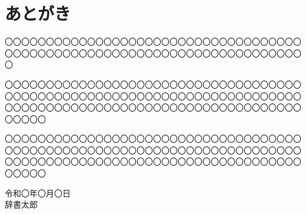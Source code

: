 \chapter*{あとがき}\label{atogaki}
\thispagestyle{plain}

〇〇〇〇〇〇〇〇〇〇〇〇〇〇〇〇〇〇〇〇〇〇〇〇〇〇〇〇〇〇〇〇〇〇〇〇〇〇〇〇〇〇〇〇〇〇〇〇〇〇〇〇〇〇〇〇〇〇〇〇〇〇〇〇〇〇〇〇〇〇〇〇〇

〇〇〇〇〇〇〇〇〇〇〇〇〇〇〇〇〇〇〇〇〇〇〇〇〇〇〇〇〇〇〇〇〇〇〇〇〇〇〇〇〇〇〇〇〇〇〇〇〇〇〇〇〇〇〇〇〇〇〇〇〇〇〇〇〇〇〇〇〇〇〇〇〇〇〇〇〇〇〇〇〇〇〇〇〇〇〇〇〇〇〇〇〇〇〇〇〇〇〇〇〇〇〇〇〇〇〇〇〇〇〇〇〇

〇〇〇〇〇〇〇〇〇〇〇〇〇〇〇〇〇〇〇〇〇〇〇〇〇〇〇〇〇〇〇〇〇〇〇〇〇〇〇〇〇〇〇〇〇〇〇〇〇〇〇〇〇〇〇〇〇〇〇〇〇〇〇〇〇〇〇〇〇〇〇〇〇〇〇〇〇〇〇〇〇〇〇〇〇〇〇〇〇〇〇〇〇〇〇〇〇〇〇〇〇〇〇〇〇〇〇〇〇〇〇〇〇

\begin{flushright}
令和〇年〇月〇日\\
辞書太郎
\end{flushright}
